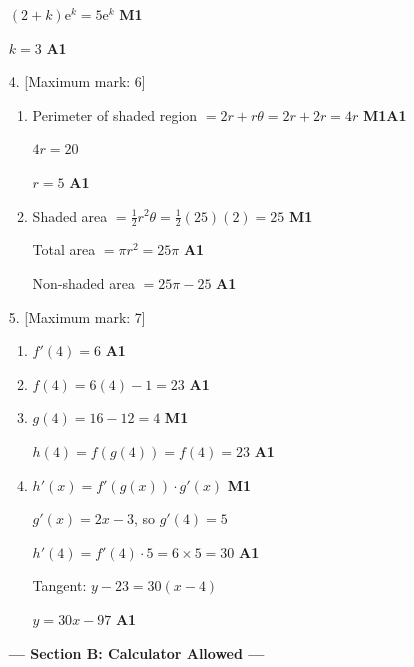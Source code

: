 \documentclass[12pt, twoside]{article}
\begin{document}
\begin{enumerate}[itemsep=0.15cm]
$(2+k)\mathrm{e}^{k} = 5\mathrm{e}^{k}$ \hfill \textbf{M1}

$k = 3$ \hfill \textbf{A1}

\bigskip

\item[4.] [Maximum mark: 6]

\begin{enumerate}
  \item Perimeter of shaded region $= 2r + r\theta = 2r + 2r = 4r$ \hfill \textbf{M1A1}

  $4r = 20$

  $r = 5$ \hfill \textbf{A1}

  \item Shaded area $= \frac{1}{2}r^{2}\theta = \frac{1}{2}(25)(2) = 25$ \hfill \textbf{M1}

  Total area $= \pi r^{2} = 25\pi$ \hfill \textbf{A1}

  Non-shaded area $= 25\pi - 25$ \hfill \textbf{A1}
\end{enumerate}

\bigskip

\item[5.] [Maximum mark: 7]

\begin{enumerate}
  \item $f'(4) = 6$ \hfill \textbf{A1}

  \item $f(4) = 6(4) - 1 = 23$ \hfill \textbf{A1}

  \setcounter{enumii}{2}
  \item $g(4) = 16 - 12 = 4$ \hfill \textbf{M1}

  $h(4) = f(g(4)) = f(4) = 23$ \hfill \textbf{A1}

  \item $h'(x) = f'(g(x)) \cdot g'(x)$ \hfill \textbf{M1}

  $g'(x) = 2x - 3$, so $g'(4) = 5$

  $h'(4) = f'(4) \cdot 5 = 6 \times 5 = 30$ \hfill \textbf{A1}

  Tangent: $y - 23 = 30(x - 4)$

  $y = 30x - 97$ \hfill \textbf{A1}
\end{enumerate}

\newpage
\begin{center}\textbf{--- Section B: Calculator Allowed ---}\end{center}


\end{enumerate}
\end{document}
